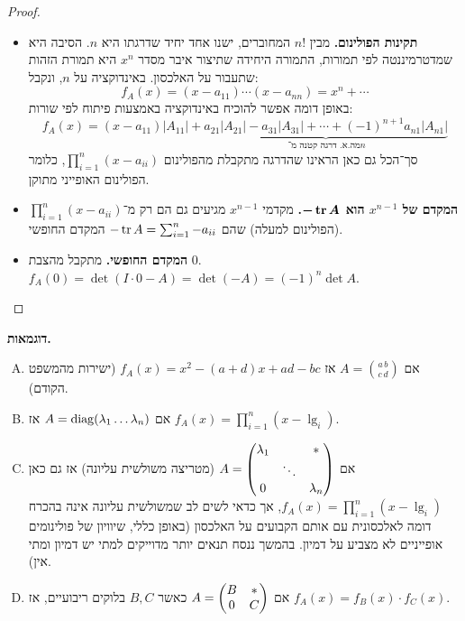 \documentclass[name=רשימות אלגברה לינארית 2א]{../../../tex/classes/megasumPreamble}
\begin{document}
	\begin{proof}\,
		\begin{itemize}
			\item\textbf{ תקינות הפולינום. }מבין $n!$ המחוברים, ישנו אחד יחיד שדרגתו היא $n$. הסיבה היא שמדטרמיננטה לפי תמורות, התמורה היחידה שתיצור איבר מסדר $x^n$ היא תמורת הזהות שתעבור על האלכסון. באינדוקציה על $n$, ונקבל: 
			\[ f_A(x) = (x - a_{11}) \cdots (x - a_{nn}) = x^{n} + \cdots \]
			באופן דומה אפשר להוכיח באינדוקציה באמצעות פיתוח לפי שורות: 
			\[ f_A(x) = (x - a_{11})|A_11| + \underbrace{a_{21}|A_21| - a_{31}|A_31| + \cdots + (-1)^{n + 1}a_{n1}|A_{n1}|}_{\,\!\text{מה.א. דרגה קטנה מ־$n$}} \]
			סך־הכל גם כאן הראינו שהדרגה מתקבלת מהפולינום $\prod^{n}_{i = 1}(x - a_{ii})$, כלומר הפולינום האופייני מתוקן. 
			
			\item\textbf{המקדם של $x^{n - 1}$ הוא $\bm{-\tr A}$. } מקדמי $x^{n - 1}$ מגיעים גם הם רק מ־$\prod^{n}_{i = 1}(x - a_{ii})$ (הפולינום למעלה) שהם $-\operatorname{tr} A = \sum_{i = 1}^{n}-a_{ii}$ המקדם החופשי. 
			\item\textbf{המקדם החופשי. }מתקבל מהצבת $0$. $f_A(0) = \det(I \cdot 0 - A) = \det(-A) = (-1)^{n}\det A$. 
		\end{itemize}\envendproof
	\end{proof}
	
	\textbf{דוגמאות. }\begin{enumerate}[A)]
		\item אם $A = \binom{a \, b}{c \, d}$ אז $f_A(x) = x^{2} - (a + d)x + ad - bc$ (ישירות מהמשפט הקודם). 
		\item אם $A = \operatorname{diag}(\lambda_1 \dots \lambda_n)$ אז $f_A(x) = \prod_{i = 1}^{n}(x - \lg_i)$. 
		\item אם $A = \begin{pmatrix} \lambda_1 & & * \\ & \ddots & \\  0 && \lambda_n \end{pmatrix}$ (מטריצה משולשית עליונה) אז גם כאן $f_A(x) = \prod_{i = 1}^{n}(x - \lg_i)$, אך כדאי לשים לב שמשולשית עליונה אינה בהכרח דומה לאלכסונית עם אותם הקבועים על האלכסון (באופן כללי, שיוויון של פולינומים אופייניים לא מצביע על דמיון. בהמשך ננסח תנאים יותר מדוייקים למתי יש דמיון ומתי אין). 
		\item אם $A = \begin{pmatrix} B & * \\ 0 & C \end{pmatrix}$ כאשר $B, C$ בלוקים ריבועיים, אז $f_A(x) = f_B(x) \cdot f_C(x)$. 
	\end{enumerate}
	
	
\end{document}
